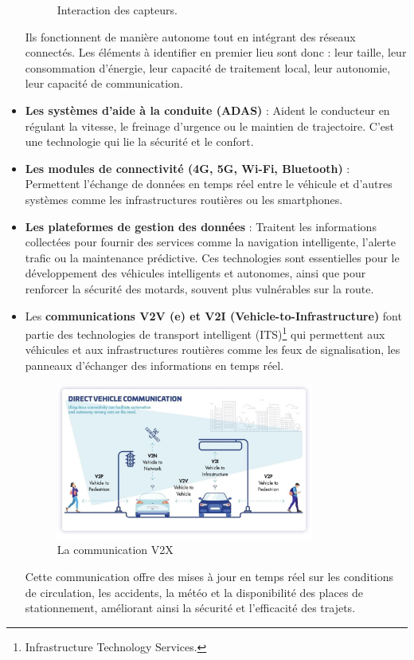 \begin{itemize}
\begin{figure}[H]
        \caption{Interaction des capteurs.}
    \end{figure}
    Ils fonctionnent de manière autonome tout en intégrant des réseaux connectés. Les éléments à identifier en premier lieu sont donc : leur taille, leur consommation d’énergie, leur capacité de traitement local, leur autonomie, leur capacité de communication.
    \item \textbf{Les systèmes d’aide à la conduite (ADAS)} : Aident le conducteur en régulant la vitesse, le freinage d’urgence ou le maintien de trajectoire. C'est une technologie qui lie la sécurité et le confort.
    \item \textbf{Les modules de connectivité (4G, 5G, Wi-Fi, Bluetooth)} : Permettent l’échange de données en temps réel entre le véhicule et d’autres systèmes comme les infrastructures routières ou les smartphones.
    \item \textbf{Les plateformes de gestion des données} : Traitent les informations collectées pour fournir des services comme la navigation intelligente, l’alerte trafic ou la maintenance prédictive.
Ces technologies sont essentielles pour le développement des véhicules intelligents et autonomes, ainsi que pour renforcer la sécurité des motards, souvent plus vulnérables sur la route.
    \item Les \textbf{communications V2V (e) et V2I (Vehicle-to-Infrastructure)} font partie des technologies de transport intelligent (ITS)\footnote{Infrastructure Technology Services.} qui permettent aux véhicules et aux infrastructures routières comme les feux de signalisation, les panneaux d’échanger des informations en temps réel.

    \begin{figure}[H]
        \centering
        \includegraphics[width=0.8\textwidth]{images/schema_v2.png} 
        \caption{La communication V2X}
    \end{figure}

    Cette communication offre des mises à jour en temps réel sur les conditions de circulation, les accidents, la météo et la disponibilité des places de stationnement, améliorant ainsi la sécurité et l’efficacité des trajets\cite{joberty_blog}.\\

\end{itemize}
\vspace{0.5cm}

